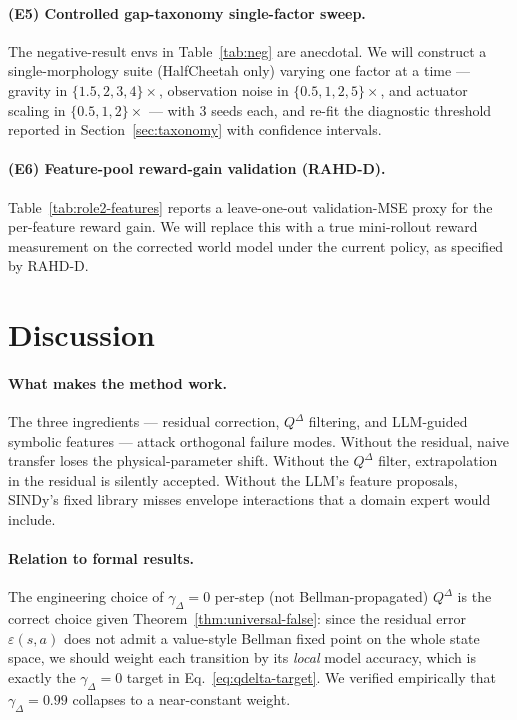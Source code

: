\documentclass{article}
\theoremstyle{definition}
\newcommand{\eps}{\varepsilon}
\newcommand{\QD}{Q^{\Delta}}
\begin{document}
\paragraph{(E5) Controlled gap-taxonomy single-factor sweep.}
The negative-result envs in Table~\ref{tab:neg} are anecdotal.  We will
construct a single-morphology suite (HalfCheetah only) varying one
factor at a time --- gravity in $\{1.5,2,3,4\}\times$, observation
noise in $\{0.5,1,2,5\}\times$, and actuator scaling in
$\{0.5,1,2\}\times$ --- with $3$ seeds each, and re-fit the diagnostic
threshold reported in Section~\ref{sec:taxonomy} with confidence
intervals.

\paragraph{(E6) Feature-pool reward-gain validation (RAHD-D).}
Table~\ref{tab:role2-features} reports a leave-one-out validation-MSE
proxy for the per-feature reward gain.  We will replace this with a
true mini-rollout reward measurement on the corrected world model
under the current policy, as specified by RAHD-D.

\section{Discussion}

\paragraph{What makes the method work.}  The three ingredients ---
residual correction, $\QD$ filtering, and LLM-guided symbolic features
--- attack orthogonal failure modes.  Without the residual, naive
transfer loses the physical-parameter shift.  Without the $\QD$ filter,
extrapolation in the residual is silently accepted.  Without the LLM's
feature proposals, SINDy's fixed library misses envelope interactions
that a domain expert would include.

\paragraph{Relation to formal results.}  The engineering choice of
$\gamma_\Delta\!=\!0$ per-step (not Bellman-propagated) $\QD$ is the
correct choice given Theorem~\ref{thm:universal-false}: since the
residual error $\eps(s,a)$ does not admit a value-style Bellman fixed
point on the whole state space, we should weight each transition by its
\emph{local} model accuracy, which is exactly the $\gamma_\Delta\!=\!0$
target in Eq.~\eqref{eq:qdelta-target}.  We verified empirically that
$\gamma_\Delta\!=\!0.99$ collapses to a near-constant weight.
\end{document}
